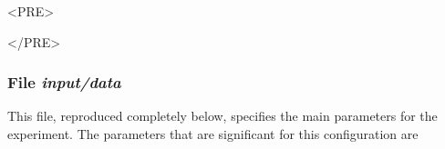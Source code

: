 \begin{rawhtml}<PRE>\end{rawhtml}
\begin{small}

\end{small}
\begin{rawhtml}</PRE>\end{rawhtml}

\subsubsection{File {\it input/data}}

This file, reproduced completely below, specifies the main parameters 
for the experiment. The parameters that are significant for this configuration
are

